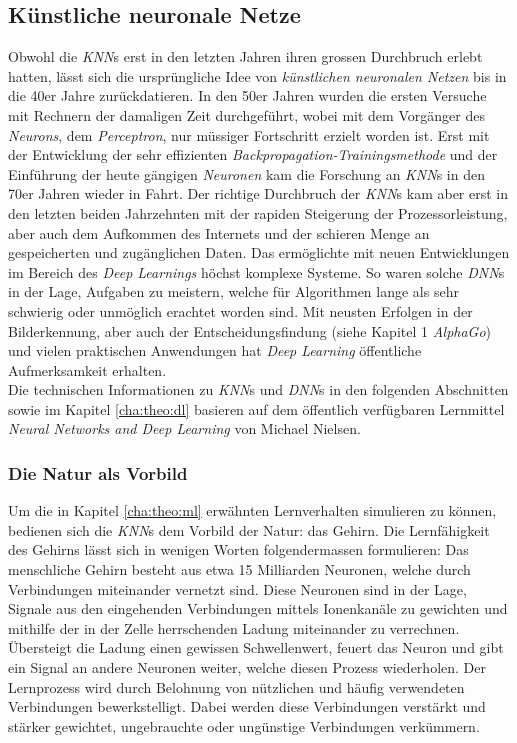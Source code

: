\subsection[KNNs]{Künstliche neuronale Netze}
Obwohl die \textit{KNN}s erst in den letzten Jahren ihren grossen Durchbruch erlebt hatten, lässt sich die ursprüngliche Idee von \textit{künstlichen neuronalen Netzen} bis in die 40er Jahre zurückdatieren. In den 50er Jahren wurden die ersten Versuche mit Rechnern der damaligen Zeit durchgeführt, wobei mit dem Vorgänger des \textit{Neurons}, dem \textit{Perceptron}, nur müssiger Fortschritt erzielt worden ist. Erst mit der Entwicklung der sehr effizienten \textit{Backpropagation-Trainingsmethode} und der Einführung der heute gängigen \textit{Neuronen} kam die Forschung an \textit{KNN}s in den 70er Jahren wieder in Fahrt. Der richtige Durchbruch der \textit{KNN}s kam aber erst in den letzten beiden Jahrzehnten mit der rapiden Steigerung der Prozessorleistung, aber auch dem Aufkommen des Internets und der schieren Menge an gespeicherten und zugänglichen Daten. Das ermöglichte mit neuen Entwicklungen im Bereich des \textit{Deep Learnings} höchst komplexe Systeme. So waren solche \textit{DNN}s in der Lage, Aufgaben zu meistern, welche für Algorithmen lange als sehr schwierig oder unmöglich erachtet worden sind. Mit neusten Erfolgen in der Bilderkennung, aber auch der Entscheidungsfindung (siehe Kapitel 1 \textit{AlphaGo}) und vielen praktischen Anwendungen hat \textit{Deep Learning} öffentliche Aufmerksamkeit erhalten\cite{ann}.\\

Die technischen Informationen zu \textit{KNN}s und \textit{DNN}s in den folgenden Abschnitten sowie im Kapitel \ref{cha:theo:dl} basieren auf dem öffentlich verfügbaren Lernmittel \textit{Neural Networks and Deep Learning} von Michael Nielsen\cite{nielsen}.

\subsubsection{Die Natur als Vorbild}
Um die in Kapitel \ref{cha:theo:ml} erwähnten Lernverhalten simulieren zu können, bedienen sich die \textit{KNN}s dem Vorbild der Natur: das Gehirn. Die Lernfähigkeit des Gehirns lässt sich in wenigen Worten folgendermassen formulieren: Das menschliche Gehirn besteht aus etwa 15 Milliarden Neuronen, welche durch  Verbindungen miteinander vernetzt sind. Diese Neuronen sind in der Lage, Signale aus den eingehenden Verbindungen mittels Ionenkanäle zu gewichten und mithilfe der in der Zelle herrschenden Ladung miteinander zu verrechnen. Übersteigt die Ladung einen gewissen Schwellenwert, feuert das Neuron und gibt ein Signal an andere Neuronen weiter, welche diesen Prozess wiederholen. Der Lernprozess wird durch Belohnung von nützlichen und häufig verwendeten Verbindungen bewerkstelligt. Dabei werden diese Verbindungen verstärkt und stärker gewichtet, ungebrauchte oder ungünstige Verbindungen verkümmern\cite{klett}.


